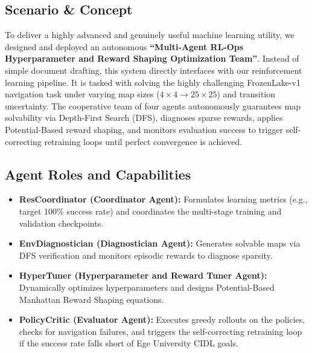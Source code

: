 \documentclass[conference]{IEEEtran}
\begin{document}
\subsection{Scenario \& Concept}
To deliver a highly advanced and genuinely useful machine learning utility, we designed and deployed an autonomous \textbf{``Multi-Agent RL-Ops Hyperparameter and Reward Shaping Optimization Team''}. Instead of simple document drafting, this system directly interfaces with our reinforcement learning pipeline. It is tasked with solving the highly challenging FrozenLake-v1 navigation task under varying map sizes ($4\times4 \to 25\times25$) and transition uncertainty. The cooperative team of four agents autonomously guarantees map solvability via Depth-First Search (DFS), diagnoses sparse rewards, applies Potential-Based reward shaping, and monitors evaluation success to trigger self-correcting retraining loops until perfect convergence is achieved.

\subsection{Agent Roles and Capabilities}
\begin{itemize}
\item \textbf{ResCoordinator (Coordinator Agent):} Formulates learning metrics (e.g., target 100\% success rate) and coordinates the multi-stage training and validation checkpoints.
\item \textbf{EnvDiagnostician (Diagnostician Agent):} Generates solvable maps via DFS verification and monitors episodic rewards to diagnose sparsity.
\item \textbf{HyperTuner (Hyperparameter and Reward Tuner Agent):} Dynamically optimizes hyperparameters and designs Potential-Based Manhattan Reward Shaping equations.
\item \textbf{PolicyCritic (Evaluator Agent):} Executes greedy rollouts on the policies, checks for navigation failures, and triggers the self-correcting retraining loop if the success rate falls short of Ege University CIDL goals.
\end{itemize}
\end{document}
